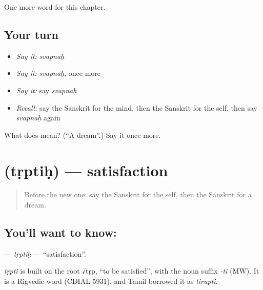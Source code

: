 \begin{grammarlens}[title={What you've built}]
One more word for this chapter.
\end{grammarlens}

\subsection*{Your turn}
\begin{itemize}
\raggedright
  \item \emph{Say it:} \emph{svapnaḥ}
  \item \emph{Say it:} \emph{svapnaḥ}, once more
  \item \emph{Say it:} say \emph{svapnaḥ}
  \item \emph{Recall:} say the Sanskrit for the mind, then the Sanskrit for the self, then say \emph{svapnaḥ} again
\end{itemize}

\begin{tcolorbox}[breakable,colback=teal!4,colframe=teal!35!black,title={Before you move on}]
What does  mean? (\textquotedblleft{}A dream\textquotedblright{}.) Say it once more.
\end{tcolorbox}
\section[\texorpdfstring{\sk{तृप्तिः} (tṛptiḥ)}{तृप्तिः (tṛptiḥ)}]{ (tṛptiḥ) — satisfaction}

\label{lesson:SA-C212-trptih}



\begin{quote}
Before the new one: say the Sanskrit for the self, then the Sanskrit for a dream.
\end{quote}

\subsection*{You'll want to know: }
\textbf{} — \emph{tṛptiḥ} — \textquotedblleft{}satisfaction\textquotedblright{}.

\begin{cousinweb}
\emph{tṛpti} is built on the root √tṛp, \textquotedblleft{}to be satisfied\textquotedblright{}, with the noun suffix \emph{-ti} (MW). It is a Rigvedic word (CDIAL 5931), and Tamil borrowed it as \emph{tirupti}.
\end{cousinweb}

